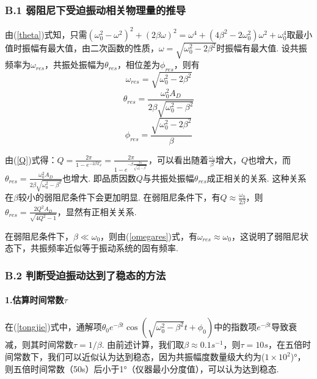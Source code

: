 \documentclass[UTF8]{ctexart}
\begin{document}
\subsubsection*{B.1 弱阻尼下受迫振动相关物理量的推导}
由(\ref{theta})式知，只需$(\omega_0^2-\omega^2)^2+(2\beta\omega)^2=\omega^4+(4\beta^2-2\omega_0^2)\omega^2+\omega_0^4$取最小值时振幅有最大值，由二次函数的性质，$\omega=\sqrt{\omega_0^2-2\beta^2}$时振幅有最大值. 设共振频率为$\omega_{res}$，共振处振幅为$\theta_{res}$，相位差为$\phi_{res}$，则有
\begin{equation}\omega_{res}=\sqrt{\omega_0^2-2\beta^2}\label{omegares}\end{equation}
\begin{equation}\theta_{res}=\frac{\omega_0^2A_D}{2\beta\sqrt{\omega_0^2-\beta^2}}\end{equation}
\begin{equation}\phi_{res}=\frac{\sqrt{\omega_0^2-2\beta^2}}{\beta}\end{equation}\par
由(\ref{Q})式得：$\displaystyle{Q=\frac{2\pi}{1-e^{-2\beta T_d}}=\frac{2\pi}{1-e^{-\beta\frac{2\pi}{\sqrt{\omega_0^2-\beta^2}}}}}$，可以看出随着$\displaystyle{\frac{\omega_0}{\beta}}$增大，$Q$也增大，而$\displaystyle{\theta_{res}=\frac{\omega_0^2A_D}{2\beta\sqrt{\omega_0^2-\beta^2}}                                                                                                                                                                                                                          }$也增大. 即品质因数$Q$与共振处振幅$\theta_{res}$成正相关的关系. 这种关系在$\beta$较小的弱阻尼条件下会更加明显. 在弱阻尼条件下，有$\displaystyle{Q\approx \frac{\omega_0}{2\beta}}$，则$\displaystyle{\theta_{res}=\frac{2Q^2A_D}{\sqrt{4Q^2-1}}}$，显然有正相关关系.\par
在弱阻尼条件下，$\beta\ll \omega_0$，则由(\ref{omegares})式，有$\omega_{res}\approx\omega_0$，这说明了弱阻尼状态下，共振频率近似等于振动系统的固有频率.
\subsubsection*{B.2 判断受迫振动达到了稳态的方法}
\paragraph{1.估算时间常数$\tau$}在(\ref{tongjie})式中，通解项$\theta_0e^{-\beta t}\cos(\sqrt{\omega_0^2-\beta^2}t+\phi_0)$中的指数项$e^{-\beta t}$导致衰减，则其时间常数$\tau=1/\beta$. 由前述计算，我们取$\beta\approx0.1s^{-1}$，则$\tau=10s$，在五倍时间常数下，我们可以近似认为达到稳态，因为共振幅度数量级大约为($1\times10^2$)°，则五倍时间常数（50s）后小于1°（仪器最小分度值），可以认为达到稳态.
\end{document}
